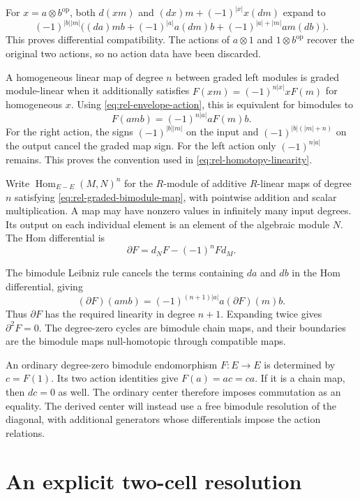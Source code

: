 For $x=a\otimes b^{\mathrm{op}}$, both
$d(xm)$ and $(dx)m+(-1)^{|x|}x(dm)$ expand to
\[
 (-1)^{|b||m|}\bigl((da)mb+(-1)^{|a|}a(dm)b
                +(-1)^{|a|+|m|}am(db)\bigr).
\]
This proves differential compatibility.
The actions of $a\otimes1$ and $1\otimes b^{\mathrm{op}}$ recover the
original two actions, so no action data have been discarded.

A homogeneous linear map of degree $n$ between graded left modules is
graded module-linear when it additionally satisfies
$F(xm)=(-1)^{n|x|}xF(m)$ for homogeneous $x$.
Using \eqref{eq:rel-envelope-action}, this is equivalent for bimodules to
\begin{equation}\label{eq:rel-graded-bimodule-map}
 F(amb)=(-1)^{n|a|}aF(m)b.
\end{equation}
For the right action, the signs $(-1)^{|b||m|}$ on the input and
$(-1)^{|b|(|m|+n)}$ on the output cancel the graded map sign.
For the left action only $(-1)^{n|a|}$ remains.
This proves the convention used in
\eqref{eq:rel-homotopy-linearity}.

Write $\operatorname{Hom}_{E-E}(M,N)^n$ for the $R$-module of additive
$R$-linear maps of degree $n$ satisfying
\eqref{eq:rel-graded-bimodule-map}, with pointwise addition and scalar
multiplication. A map may have nonzero values in
infinitely many input degrees. Its output on each individual element is
an element of the algebraic module $N$.
The Hom differential is
\begin{equation}\label{eq:rel-hom-differential}
 \partial F=d_NF-(-1)^nFd_M.
\end{equation}

The bimodule Leibniz rule cancels the terms containing $da$ and $db$ in
the Hom differential, giving
\[
 (\partial F)(amb)=(-1)^{(n+1)|a|}a(\partial F)(m)b.
\]
Thus $\partial F$ has the required linearity in degree $n+1$.
Expanding twice gives $\partial^2F=0$.
The degree-zero cycles are bimodule chain maps, and their boundaries are
the bimodule maps null-homotopic through compatible maps.

An ordinary degree-zero bimodule endomorphism $F:E\to E$ is determined
by $c=F(1)$. Its two action identities give $F(a)=ac=ca$.
If it is a chain map, then $dc=0$ as well.
The ordinary center therefore imposes commutation as an equality.
The derived center will instead use a free bimodule resolution of the
diagonal, with additional generators whose differentials impose the
action relations.

\section{An explicit two-cell resolution}
\label{sec:rel-resolution}

